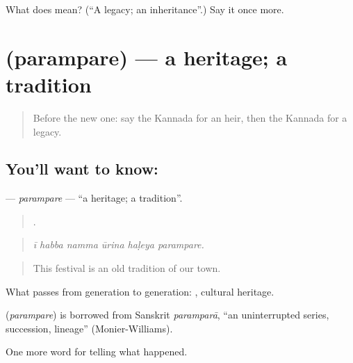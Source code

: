\begin{tcolorbox}[breakable,colback=teal!4,colframe=teal!35!black,title={Before you move on}]
What does  mean? (\textquotedblleft{}A legacy; an inheritance\textquotedblright{}.) Say it once more.
\end{tcolorbox}
\section[\texorpdfstring{\kn{ಪರಂಪರೆ} (parampare)}{ಪರಂಪರೆ (parampare)}]{ (parampare) — a heritage; a tradition}

\label{lesson:KA-C353-parampare}



\begin{quote}
Before the new one: say the Kannada for an heir, then the Kannada for a legacy.
\end{quote}

\subsection*{You'll want to know: }
\textbf{} — \emph{parampare} — \textquotedblleft{}a heritage; a tradition\textquotedblright{}.

\begin{quote}
     .
\end{quote}

\begin{quote}
\emph{ī habba namma ūrina haḷeya parampare.}
\end{quote}

\begin{quote}
This festival is an old tradition of our town.
\end{quote}

What passes from generation to generation:  , cultural heritage.

\begin{cousinweb}
\textbf{} (\emph{parampare}) is borrowed from Sanskrit \emph{paramparā}, \textquotedblleft{}an uninterrupted series, succession, lineage\textquotedblright{} (Monier-Williams).
\end{cousinweb}

\begin{grammarlens}[title={What you've built}]
One more word for telling what happened.
\end{grammarlens}

